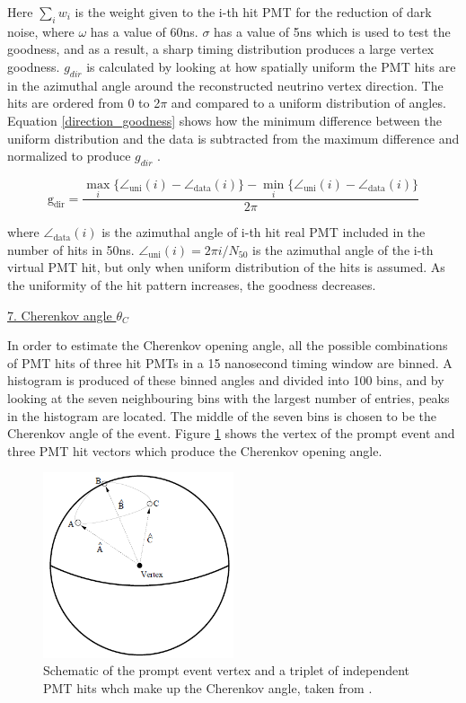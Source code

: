 Here $\sum_{i} w_{i}$ is the weight given to the i-th hit PMT for the reduction of dark noise, where $\omega$ has a value of 60ns. $\sigma$ has a value of 5ns which is used to test the goodness, and as a result, a sharp timing distribution produces a large vertex goodness. $g_{dir}$ is calculated by looking at how spatially uniform the PMT hits are in the azimuthal angle around the reconstructed neutrino vertex direction. The hits are ordered from 0 to 2$\pi$ and compared to a uniform distribution of angles. Equation \ref{direction_goodness} shows how the minimum difference between the uniform distribution and the data is subtracted from the maximum difference and normalized to produce $g_{dir}$ .

\begin{equation}
    \mathrm{g}_{\mathrm{dir}}=\frac{\max _{i}\{\angle_{\mathrm{uni}}(i)-\angle_{\mathrm{data}}(i)\}-\min _{i}\{\angle_{\mathrm{uni}}(i)-\angle_{\mathrm{data}}(i)\}}{2 \pi}
\label{direction_goodness}
\end{equation}

where $\angle_{\mathrm{data}}(i)$ is the azimuthal angle of i-th hit real PMT included in the number of hits in 50ns. $\angle_{\mathrm{uni}}(i)=2 \pi i / N_{50}$ is the azimuthal angle of the i-th virtual PMT hit, but only when uniform distribution of the hits is assumed. As the uniformity of the hit pattern increases, the goodness decreases. 
 


\noindent
\underline{7. Cherenkov angle $\theta_{C}$}\\
\noindent

In order to estimate the Cherenkov opening angle, all the possible combinations of PMT hits of three hit PMTs in a 15 nanosecond timing window are binned. A histogram is produced of these binned angles and divided into 100 bins, and by looking at the seven neighbouring bins with the largest number of entries, peaks in the histogram are located. The middle of the seven bins is chosen to be the Cherenkov angle of the event. Figure \ref{fig:cherenkov_hit_triplet} shows the vertex of the prompt event and three PMT hit vectors which produce the Cherenkov opening angle. 

\begin{figure}
    \centering
    \includegraphics[width=0.5\textwidth]{Figures/cherenkov_hit_triplet.png}
    \caption{Schematic of the prompt event vertex and a triplet of independent PMT hits whch make up the Cherenkov angle, taken from \cite{malek_thesis}.}
    \label{fig:cherenkov_hit_triplet}

\end{figure}


